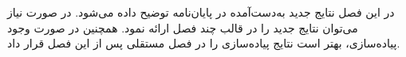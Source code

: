 

در این فصل نتایج جدید به‌دست‌آمده در پایان‌نامه توضیح داده می‌شود.
در صورت نیاز می‌توان نتایج جدید را در قالب چند فصل ارائه نمود.
همچنین در صورت وجود پیاده‌سازی، بهتر است نتایج پیاده‌سازی را 
در فصل مستقلی پس از این فصل قرار داد.



\def \selectedItems{FirstItem,SecondItem,AnotherItem,AverageOfItems}


